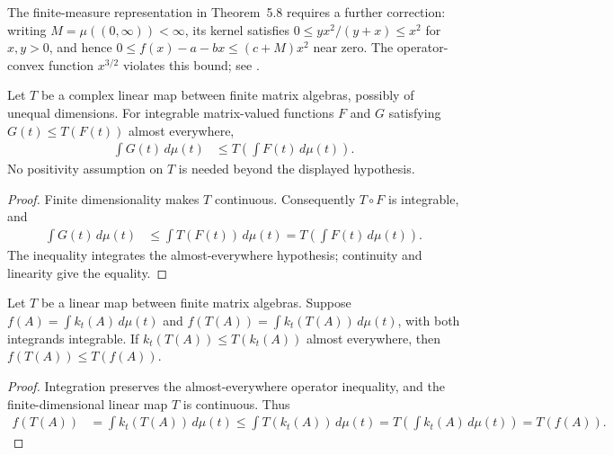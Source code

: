 The finite-measure representation in Theorem~5.8 requires a further
correction: writing $M=\mu((0,\infty))<\infty$, its kernel satisfies
$0\leq yx^2/(y+x)\leq x^2$ for $x,y>0$, and hence
$0\leq f(x)-a-bx\leq(c+M)x^2$ near zero. The operator-convex
function $x^{3/2}$ violates this bound; see
\cite{gap:wolf_ch5_finite_measure_representation}.

\begin{lemma}
\label{lem:ordered-integral-linear-map}
\leanok
Let $T$ be a complex linear map between finite matrix algebras, possibly of
unequal dimensions. For integrable matrix-valued functions $F$ and $G$
satisfying $G(t)\leq T(F(t))$ almost everywhere,
\begin{align}
 \int G(t)\,d\mu(t)&\leq T\!\left(\int F(t)\,d\mu(t)\right).
    \label{eq:ch06_ordered_integral_linear_map}
\end{align}
No positivity assumption on $T$ is needed beyond the displayed hypothesis.
\end{lemma}
\begin{proof}\leanok
Finite dimensionality makes $T$ continuous. Consequently $T\circ F$ is
integrable, and
\begin{align}
 \int G(t)\,d\mu(t)&\leq\int T(F(t))\,d\mu(t)
 =T\!\left(\int F(t)\,d\mu(t)\right).
    \label{eq:ch06_ordered_integral_linear_map_proof}
\end{align}
The inequality integrates the almost-everywhere hypothesis; continuity and
linearity give the equality.
\end{proof}

\begin{lemma}
\label{lem:integral-jensen-assembly}
\leanok
Let $T$ be a linear map between finite matrix algebras. Suppose
$f(A)=\int k_t(A)\,d\mu(t)$ and $f(T(A))=\int k_t(T(A))\,d\mu(t)$,
with both integrands integrable. If $k_t(T(A))\leq T(k_t(A))$ almost
everywhere, then $f(T(A))\leq T(f(A))$.
\end{lemma}
\begin{proof}\leanok
{}
Integration preserves the almost-everywhere operator inequality, and the
finite-dimensional linear map $T$ is continuous. Thus
\begin{align}
 f(T(A))&=\int k_t(T(A))\,d\mu(t)
 \leq\int T(k_t(A))\,d\mu(t)
 =T\!\left(\int k_t(A)\,d\mu(t)\right)=T(f(A)).
    \label{eq:ch06_integral_jensen_assembly}
\end{align}
\end{proof}

